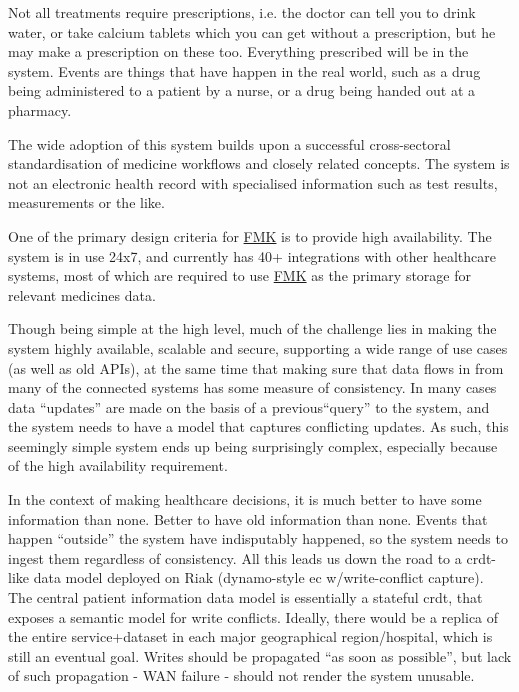 Not all treatments require prescriptions, i.e. the doctor can tell you to drink water, or take calcium tablets which you can get without a prescription, but he may make a prescription on these too. Everything prescribed will be in the system. Events are things that have happen in the real world, such as a drug being administered to a patient by a nurse, or a drug being handed out at a pharmacy. 

The wide adoption of this system builds upon a successful cross-sectoral standardisation of medicine workflows and closely related concepts. The system is not an electronic health record with specialised information such as test results, measurements or the like.

One of the primary design criteria for \href{https://www.trifork.com/news/a-prestigious-prize-trifork-public}{FMK} is to provide high availability. The system is in use 24x7, and currently has 40+ integrations with other healthcare systems, most of which are required to use \href{https://www.trifork.com/news/a-prestigious-prize-trifork-public}{FMK} as the primary storage for relevant medicines data. 

Though being simple at the high level, much of the challenge lies in making the system highly available, scalable and secure, supporting a wide range of use cases (as well as old APIs), at the same time that making sure that data flows in from many of the connected systems has some measure of consistency. In many cases data \textquotedblleft updates\textquotedblright{} are made on the basis of a previous\textquotedblleft query\textquotedblright{} to the system, and the system needs to have a model that captures conflicting updates. As such, this seemingly simple system ends up being surprisingly complex, especially because of the high availability requirement. 

In the context of making healthcare decisions, it is much better to have some information than none. Better to have old information than none. Events that happen \textquotedblleft outside\textquotedblright{} the system have indisputably happened, so the system needs to ingest them regardless of consistency. All this leads us down the road to a \gls{crdt}-like data model deployed on Riak (dynamo-style \gls{ec} w/write-conflict capture). The central patient information data model is essentially a stateful \gls{crdt}, that exposes a semantic model for write conflicts. Ideally, there would be a replica of the entire service+dataset in each major geographical region/hospital, which is still an eventual goal. Writes should be propagated \textquotedblleft as soon as possible\textquotedblright , but lack of such propagation - WAN failure - should not render the system unusable.

